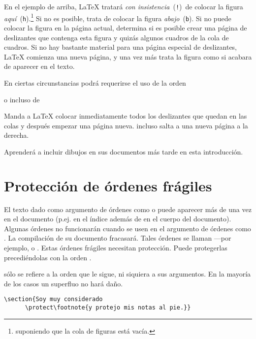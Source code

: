 En el ejemplo de arriba, \LaTeX{} tratará \emph{con insistencia}~(\texttt{!})\ de colocar la figura \emph{aquí}~(\texttt{h}).\footnote{suponiendo que la cola de figuras está vacía.} Si no es posible, trata de colocar la figura \emph{abajo}~(\texttt{b}).  Si no puede colocar la figura en la página actual, determina si es posible crear una página de deslizantes que contenga esta figura y quizás algunos cuadros de la cola de cuadros. Si no hay bastante material para una página especial de deslizantes, \LaTeX{} comienza una nueva página, y una vez más trata la figura como si acabara de aparecer en el texto.

En ciertas circunstancias podrá requerirse el uso de la orden

\begin{lscommand}
 o incluso de  
\end{lscommand}

Manda a \LaTeX{} colocar inmediatamente todos los deslizantes que quedan en las colas y después empezar una página nueva.  incluso salta a una nueva página a la derecha.

Aprenderá a incluir dibujos \PSi{} en sus documentos \LaTeXe{} más tarde en esta introducción.

\section{Protección de órdenes frágiles}

El texto dado como argumento de órdenes como  o  puede aparecer más de una vez en el documento (p.ej.{} en el índice además de en el cuerpo del documento).  Algunas órdenes no funcionarán cuando se usen en el argumento de órdenes como .  La compilación de su documento fracasará.  Tales órdenes se llaman  ---por ejemplo,  o .  Estas órdenes frágiles necesitan protección.  Puede protegerlas precediéndolas con la orden .

 sólo se refiere a la orden que le sigue, ni siquiera a sus argumentos.  En la mayoría de los casos un  superfluo no hará daño.

\begin{code}
\verb|\section{Soy muy considerado|\\
\verb|      \protect\footnote{y protejo mis notas al pie.}}|
\end{code}
